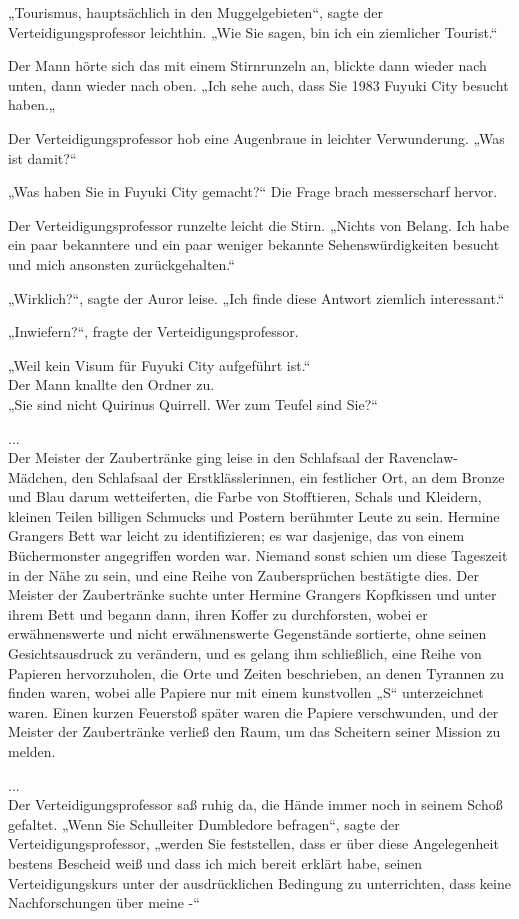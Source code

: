 {„Tourismus, hauptsächlich in den Muggelgebieten“, sagte der Verteidigungsprofessor leichthin. „Wie Sie sagen, bin ich ein ziemlicher Tourist.“

Der Mann hörte sich das mit einem Stirnrunzeln an, blickte dann wieder nach unten, dann wieder nach oben. „Ich sehe auch, dass Sie 1983 Fuyuki City besucht haben.„

Der Verteidigungsprofessor hob eine Augenbraue in leichter Verwunderung. „Was ist damit?“

„Was haben Sie in Fuyuki City gemacht?“ Die Frage brach messerscharf hervor.

Der Verteidigungsprofessor runzelte leicht die Stirn. „Nichts von Belang. Ich habe ein paar bekanntere und ein paar weniger bekannte Sehenswürdigkeiten besucht und mich ansonsten zurückgehalten.“

„Wirklich?“, sagte der Auror leise. „Ich finde diese Antwort ziemlich interessant.“

„Inwiefern?“, fragte der Verteidigungsprofessor.

„Weil kein Visum für Fuyuki City aufgeführt ist.“\\ Der Mann knallte den Ordner zu.\\ „Sie sind nicht Quirinus Quirrell. Wer zum Teufel sind Sie?“

...\\ Der Meister der Zaubertränke ging leise in den Schlafsaal der Ravenclaw-Mädchen, den Schlafsaal der Erstklässlerinnen, ein festlicher Ort, an dem Bronze und Blau darum wetteiferten, die Farbe von Stofftieren, Schals und Kleidern, kleinen Teilen billigen Schmucks und Postern berühmter Leute zu sein. Hermine Grangers Bett war leicht zu identifizieren; es war dasjenige, das von einem Büchermonster angegriffen worden war. Niemand sonst schien um diese Tageszeit in der Nähe zu sein, und eine Reihe von Zaubersprüchen bestätigte dies. Der Meister der Zaubertränke suchte unter Hermine Grangers Kopfkissen und unter ihrem Bett und begann dann, ihren Koffer zu durchforsten, wobei er erwähnenswerte und nicht erwähnenswerte Gegenstände sortierte, ohne seinen Gesichtsausdruck zu verändern, und es gelang ihm schließlich, eine Reihe von Papieren hervorzuholen, die Orte und Zeiten beschrieben, an denen Tyrannen zu finden waren, wobei alle Papiere nur mit einem kunstvollen „S“ unterzeichnet waren. Einen kurzen Feuerstoß später waren die Papiere verschwunden, und der Meister der Zaubertränke verließ den Raum, um das Scheitern seiner Mission zu melden.

...\\ Der Verteidigungsprofessor saß ruhig da, die Hände immer noch in seinem Schoß gefaltet. „Wenn Sie Schulleiter Dumbledore befragen“, sagte der Verteidigungsprofessor, „werden Sie feststellen, dass er über diese Angelegenheit bestens Bescheid weiß und dass ich mich bereit erklärt habe, seinen Verteidigungskurs unter der ausdrücklichen Bedingung zu unterrichten, dass keine Nachforschungen über meine -“

}
